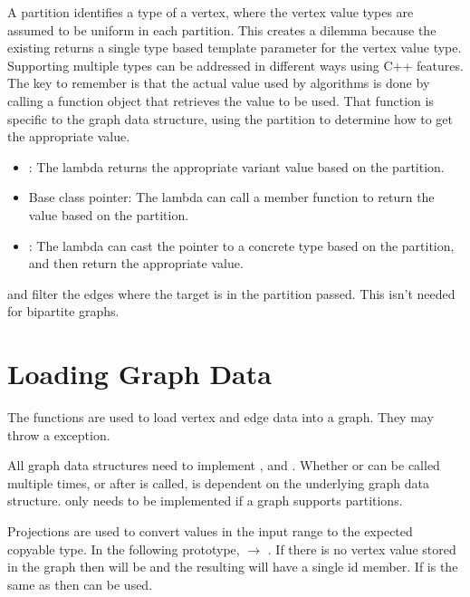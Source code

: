 A partition identifies a type of a vertex, where the vertex value types are assumed to be uniform in each partition. This creates a dilemma because 
the existing  returns a single type based template parameter for the vertex value type. Supporting 
multiple types can be addressed in different ways using C++ features. The key to remember is that the actual value used by algorithms is done
by calling a function object that retrieves the value to be used. That function is specific to the graph data structure, using the partition to 
determine how to get the appropriate value.
\begin{itemize}
    \item
          : The lambda returns the appropriate variant value based on the partition.
    \item
          Base class pointer: The lambda can call a member function to return the value based on the partition.
    \item
          : The lambda can cast the pointer to a concrete type based on the partition, and
          then return the appropriate value.
\end{itemize}

 and  filter the edges where the target is in the partition  passed.
This isn't needed for bipartite graphs.

\section{Loading Graph Data}

The  functions are used to load vertex and edge data into a graph. They may throw a  exception.

All graph data structures need to implement ,  and . 
Whether  or  can be called multiple times, or after  is called, is dependent on the underlying graph data structure.
 only needs to be implemented if a graph supports partitions.

Projections are used to convert values in the input range to the expected copyable type. In the following  
prototype,  $\rightarrow$ .
If there is no vertex value stored in the graph then  will be  and the resulting 
 will have a single id member. If  is the same as
 then  can be used.

